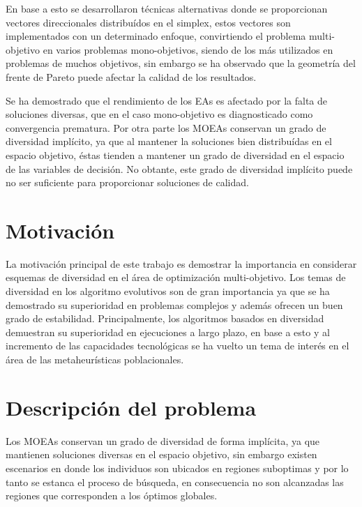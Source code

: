 En base a esto se desarrollaron técnicas alternativas donde se proporcionan vectores direccionales distribuídos en el simplex, estos vectores son implementados con un determinado enfoque, convirtiendo el problema multi-objetivo en varios problemas mono-objetivos, siendo de los más utilizados en problemas de muchos objetivos, sin embargo se ha observado que la geometría del frente de Pareto puede afectar la calidad de los resultados.


Se ha demostrado que el rendimiento de los EAs es afectado por la falta de soluciones diversas, que en el caso mono-objetivo es diagnosticado como convergencia prematura.
%
Por otra parte los MOEAs conservan un grado de diversidad implícito, ya que al mantener la soluciones bien distribuídas en el espacio objetivo, éstas tienden a mantener un grado de diversidad en el espacio de las variables de decisión.
%
No obtante, este grado de diversidad implícito puede no ser suficiente para proporcionar soluciones de calidad.

\section{Motivación}
La motivación principal de este trabajo es demostrar la importancia en considerar esquemas de diversidad en el área de optimización multi-objetivo.
%
Los temas de diversidad en los algoritmo evolutivos son de gran importancia ya que se ha demostrado su superioridad en problemas complejos y además ofrecen un buen grado de estabilidad.
%
Principalmente, los algoritmos basados en diversidad demuestran su superioridad en ejecuciones a largo plazo, en base a esto y al incremento de las capacidades tecnológicas se ha vuelto un tema de interés en el área de las metaheurísticas poblacionales.

\section{Descripción del problema}

Los MOEAs conservan un grado de diversidad de forma implícita, ya que mantienen soluciones diversas en el espacio objetivo, sin embargo existen escenarios en donde los individuos son ubicados en regiones suboptimas y por lo tanto se estanca el proceso de búsqueda, en consecuencia no son alcanzadas las regiones que corresponden a los óptimos globales.
%



